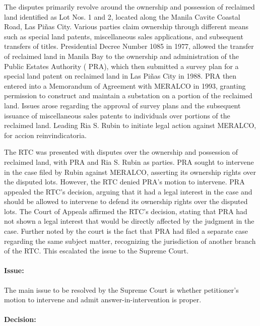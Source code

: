 \documentclass[
12pt,
oneside,
onehalfspacing,
headsepline
]{DigestCollection}
\begin{document}
The disputes primarily revolve around the ownership and possession of reclaimed land identified as Lot Nos. 1 and 2, located along the Manila Cavite Coastal Road, Las Piñas City. Various parties claim ownership through different means such as special land patents, miscellaneous sales applications, and subsequent transfers of titles. Presidential Decree Number 1085 in 1977, allowed the transfer of reclaimed land in Manila Bay to the ownership and administration of the Public Estates Authority ( PRA), which then submitted a survey plan for a special land patent on reclaimed land in Las Piñas City in 1988. PRA then entered into a Memorandum of Agreement with MERALCO in 1993, granting permission to construct and maintain a substation on a portion of the reclaimed land. Issues arose regarding the approval of survey plans and the subsequent issuance of miscellaneous sales patents to individuals over portions of the reclaimed land. Leading Ria S. Rubin to initiate legal action against MERALCO, for accion reinvindicatoria. 

The RTC was presented with disputes over the ownership and possession of reclaimed land, with PRA and Ria S. Rubin as parties. PRA sought to intervene in the case filed by Rubin against MERALCO, asserting its ownership rights over the disputed lots. However, the RTC denied PRA's motion to intervene. PRA appealed the RTC's decision, arguing that it had a legal interest in the case and should be allowed to intervene to defend its ownership rights over the disputed lots. The Court of Appeals affirmed the RTC's decision, stating that PRA had not shown a legal interest that would be directly affected by the judgment in the case. Further noted by the court is the fact that PRA had filed a separate case regarding the same subject matter, recognizing the jurisdiction of another branch of the RTC. This escalated the issue to the Supreme Court. 

\paragraph{Issue:}
\label{cc0acb10-09fd-11ef-932c-63c852f65e48}


The main issue to be resolved by the Supreme Court is whether petitioner's motion to intervene and admit answer-in-intervention is proper.

\paragraph{Decision:}
\label{ce125ae0-09fd-11ef-932c-63c852f65e48}
\end{document}
